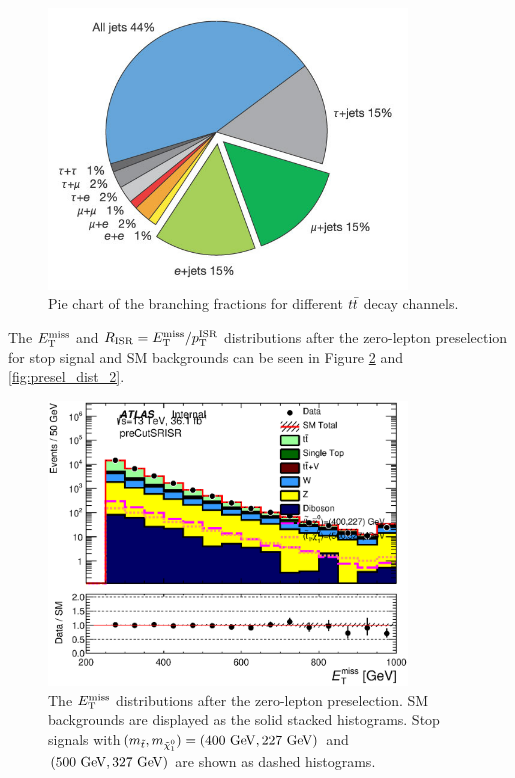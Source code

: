 \begin{figure}[h!]
  \begin{center}
    	\includegraphics[width=0.85\textwidth]{figures/strategy/ttbarDecay.jpg}
   \end{center}
\caption{ Pie chart of the branching fractions for different $t\bar{t}$ decay channels. }
\label{fig:ttbardecay} 
\end{figure}

\indent The $\met$ and $R_{\mathrm{ISR}} = E_{\mathrm{T}}^{\mathrm{miss}}/p_{\mathrm{T}}^{\mathrm{ISR}}$ distributions after the zero-lepton preselection for stop signal and SM backgrounds can be seen in Figure \ref{fig:presel_dist_1} and \ref{fig:presel_dist_2}.  \\

\begin{figure}[h!]
\centering
    	 \includegraphics[width=0.85\textwidth]{figures/plotRegion/Met_preCutSRISR_log.eps}
\caption[The $\met$ distribution after zero-lepton preselection for stop signal and SM background]{ The $\met$ distributions after the zero-lepton preselection.  SM backgrounds are displayed as the solid stacked histograms.  Stop signals with$(m_{\stop}, m_{\ninoone}) = (400 \gev,227 \gev)$ and $(500 \gev, 327 \gev)$ are shown as dashed histograms.  } %
\label{fig:presel_dist_1} 
\end{figure}

